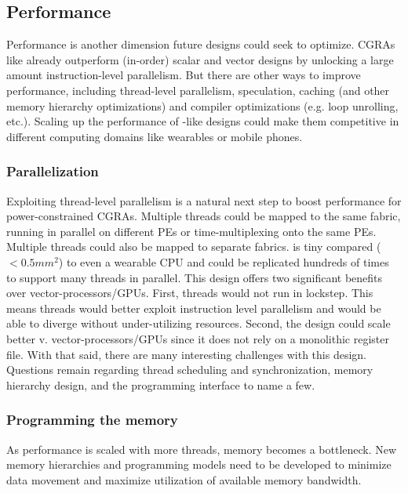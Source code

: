 \subsection{Performance}
Performance is another dimension future designs could seek to optimize.
% 
CGRAs like \riptide already outperform (in-order) scalar and vector designs by unlocking a large amount instruction-level parallelism.
% 
But there are other ways to improve performance, including thread-level parallelism, speculation, caching (and other memory hierarchy optimizations) and compiler optimizations (e.g. loop unrolling, etc.).
% 
Scaling up the performance of \riptide-like designs could make them competitive in different computing domains like wearables or mobile phones.

\subsubsection{Parallelization}
Exploiting thread-level parallelism is a natural next step to boost performance for power-constrained CGRAs.
% 
Multiple threads could be mapped to the same fabric, running in parallel on different PEs or time-multiplexing onto the same PEs.
%
Multiple threads could also be mapped to separate fabrics. 
% 
\riptide is tiny compared ($<0.5mm^2$) to even a wearable CPU and could be replicated hundreds of times to support many threads in parallel.
% 
This design offers two significant benefits over vector-processors/GPUs.
% 
First, threads would not run in lockstep.
This means threads would better exploit instruction level parallelism and would be able to diverge without under-utilizing resources.
Second, the design could scale better v. vector-processors/GPUs since it does not rely on a monolithic register file.
% 
With that said, there are many interesting challenges with this design.
% 
Questions remain regarding thread scheduling and synchronization, memory hierarchy design, and the programming interface to name a few.

\subsubsection{Programming the memory}
As performance is scaled with more threads, memory becomes a bottleneck.
% 
New memory hierarchies and programming models need to be developed to minimize data movement and maximize utilization of available memory bandwidth.

